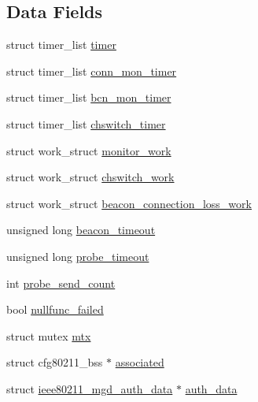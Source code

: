 \subsection*{Data Fields}
\begin{DoxyCompactItemize}
\item 
struct timer\-\_\-list \hyperlink{structieee80211__if__managed_ae8aedee6c0bd2f7edbb10f18d574f107}{timer}
\item 
struct timer\-\_\-list \hyperlink{structieee80211__if__managed_aa7a9ba2f3ff577fcfa5816581282be94}{conn\-\_\-mon\-\_\-timer}
\item 
struct timer\-\_\-list \hyperlink{structieee80211__if__managed_af3925492fec1b2070226f61652566dad}{bcn\-\_\-mon\-\_\-timer}
\item 
struct timer\-\_\-list \hyperlink{structieee80211__if__managed_abdbc25246eac23118acaa38dc7771c47}{chswitch\-\_\-timer}
\item 
struct work\-\_\-struct \hyperlink{structieee80211__if__managed_a7efa2f92a2e739478df99cdb5422b73f}{monitor\-\_\-work}
\item 
struct work\-\_\-struct \hyperlink{structieee80211__if__managed_ab57ec934f545969e4955bdee8a2fb00d}{chswitch\-\_\-work}
\item 
struct work\-\_\-struct \hyperlink{structieee80211__if__managed_af67aa5a3888b63ed23edc726fb2d6ce1}{beacon\-\_\-connection\-\_\-loss\-\_\-work}
\item 
unsigned long \hyperlink{structieee80211__if__managed_a8a24e16fe603bb3df44779268f4a0875}{beacon\-\_\-timeout}
\item 
unsigned long \hyperlink{structieee80211__if__managed_ae94fded3ca4f10915a7d3d29638c47d7}{probe\-\_\-timeout}
\item 
int \hyperlink{structieee80211__if__managed_aa9ccec90b375e5c56cc2d521d50e1f3c}{probe\-\_\-send\-\_\-count}
\item 
bool \hyperlink{structieee80211__if__managed_af9e271bf4cdd6d0d63259a9603c7db2d}{nullfunc\-\_\-failed}
\item 
struct mutex \hyperlink{structieee80211__if__managed_a06f637951b74c996f2e4987a7be1dbdd}{mtx}
\item 
struct cfg80211\-\_\-bss $\ast$ \hyperlink{structieee80211__if__managed_aa0d8552cc543334097401fdff5a5d74e}{associated}
\item 
struct \hyperlink{structieee80211__mgd__auth__data}{ieee80211\-\_\-mgd\-\_\-auth\-\_\-data} $\ast$ \hyperlink{structieee80211__if__managed_a5736366c204cb94c1db9e4e65a0df203}{auth\-\_\-data}
\item 

\end{DoxyCompactItemize}
